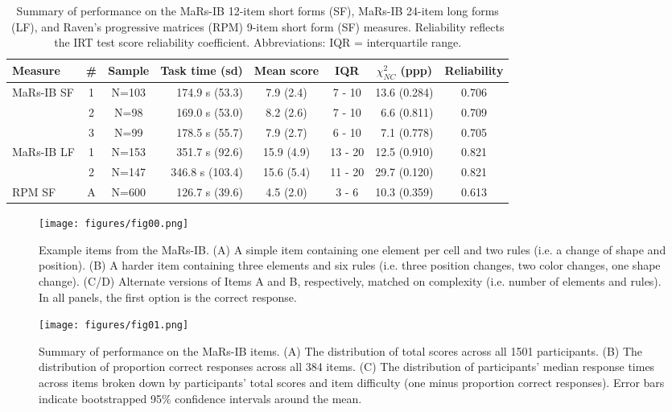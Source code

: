 \documentclass[a4paper,man,natbib,noextraspace]{apa6}
\begin{document}
\begin{table}
    \small
    \centering
    \begin{tabular*}{1.07\textwidth}{lccrccrc}
    \toprule
    Measure & \# & Sample & \multicolumn{1}{c}{Task time (sd)} & \multicolumn{1}{c}{Mean score} (sd) & IQR & \multicolumn{1}{c}{$\chi^2_{NC}$ (ppp)} & Reliability \\
    \midrule
    MaRs-IB SF & 1 & N=103 & 174.9 s  (53.3)  &  7.9 (2.4) &  7 - 10 & 13.6 (0.284) & 0.706 \\
               & 2 & N=98  & 169.0 s  (53.0)  &  8.2 (2.6) &  7 - 10 & 6.6 (0.811)  & 0.709 \\
               & 3 & N=99  & 178.5 s  (55.7)  &  7.9 (2.7) &  6 - 10 & 7.1 (0.778)  & 0.705 \\
    \midrule
    MaRs-IB LF & 1 & N=153  & 351.7 s (92.6)  & 15.9 (4.9) & 13 - 20 & 12.5 (0.910) & 0.821 \\
               & 2 & N=147  & 346.8 s (103.4) & 15.6 (5.4) & 11 - 20 & 29.7 (0.120) & 0.821 \\
    \midrule
    RPM SF     & A & N=600  & 126.7 s (39.6)  &  4.5 (2.0) &  3 - 6  & 10.3 (0.359) & 0.613 \\
    \bottomrule
    \end{tabular*}
    \caption{\label{table:3}\normalfont Summary of performance on the MaRs-IB 12-item short forms (SF), MaRs-IB 24-item long forms (LF), and Raven's progressive matrices (RPM) 9-item short form (SF) measures. Reliability reflects the IRT test score reliability coefficient. Abbreviations: IQR = interquartile range.}
\end{table}


\begin{figure}
\centering
\texttt{[image: figures/fig00.png]}
\caption{\label{fig:fig00} Example items from the MaRs-IB. (A) A simple item containing one element per cell and two rules (i.e. a change of shape and position). (B) A harder item containing three elements and six rules (i.e. three position changes, two color changes, one shape change). (C/D) Alternate versions of Items A and B, respectively, matched on complexity (i.e. number of elements and rules). In all panels, the first option is the correct response.}
\end{figure}

\begin{figure}
\centering
\texttt{[image: figures/fig01.png]}
\caption{\label{fig:fig01}Summary of performance on the MaRs-IB items. (A) The distribution of total scores across all 1501 participants. (B) The distribution of proportion correct responses across all 384 items. (C) The distribution of participants' median response times across items broken down by participants' total scores and item difficulty (one minus proportion correct responses). Error bars indicate bootstrapped 95\% confidence intervals around the mean.}
\end{figure}
\end{document}
